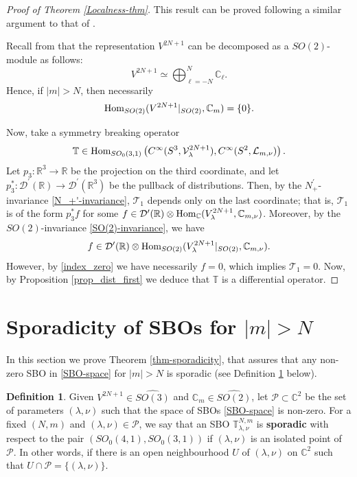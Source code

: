 \documentclass[12pt, pdflatex, a4paper]{article}
\theoremstyle{plain}
\theoremstyle{definition}
\newtheorem{defn}[thm]{Definition}
\def\C{{\mathbb C}}
\def\Dist{\mathcal{D}^\prime}
\def\Hom{\text{\normalfont{Hom}}}
\def\L{\mathcal{L}}
\def\P{\mathcal{P}}
\def\R{{\mathbb R}}
\def\T{{\mathbb T}}
\def\V{\mathcal{V}}
\begin{document}
\begin{proof}[Proof of Theorem \ref{Localness-thm}]
This result can be proved following a similar argument to that of \cite[Thm. 3.6]{KS18}.

Recall from \cite[Lem. 4.1]{Per-Val24} that the representation $V^{2N+1}$ can be decomposed as a $SO(2)$-module as follows:
\begin{equation*}
V^{2N+1} \simeq \bigoplus_{\ell = -N}^N \C_\ell.
\end{equation*}
Hence, if $|m| > N$, then necessarily
\begin{equation}\label{index_zero}
\Hom_{SO(2)}(V^{2N+1}\rvert_{SO(2)}, \C_m) = \{0\}.
\end{equation}

Now, take a symmetry breaking operator 
\begin{equation*}
\mathbb{T} \in \Hom_{SO_0(3,1)}\left(C^\infty(S^3, \V_\lambda^{2N+1}), C^\infty(S^2, \L_{m,\nu})\right).
\end{equation*}
Let $p_3: \R^3 \rightarrow \R$ be the projection on the third coordinate, and let $p_3^*: \Dist(\R) \rightarrow \Dist(\R^3)$ be the pullback of distributions. Then, by the $N_+^\prime$-invariance
\eqref{N_+'-invariance}, $\mathcal{T}_1$ depends only on the last coordinate; that is, $\mathcal{T}_1$ is of the form $p_3^*f$ for some $f \in \Dist(\R) \otimes \Hom_\C(V_\lambda^{2N+1}, \C_{m, \nu})$. Moreover, by the $SO(2)$-invariance \eqref{SO(2)-invariance}, we have
\begin{equation*}
f \in \Dist(\R) \otimes \Hom_{SO(2)}(V_\lambda^{2N+1}\rvert_{SO(2)}, \C_{m, \nu}).
\end{equation*}
However, by \eqref{index_zero} we have necessarily $f = 0$, which implies $\mathcal{T}_1 = 0$. Now, by Proposition \ref{prop_dist_first} we deduce that $\mathbb{T}$ is a differential operator.
\end{proof}

\section{Sporadicity of SBOs for $|m| > N$}\label{section-sporadicity}
In this section we prove Theorem \ref{thm-sporadicity}, that assures that any non-zero SBO in \eqref{SBO-space} for $|m| > N$ is sporadic (see Definition \ref{def-sporadic} below).


\begin{defn}\label{def-sporadic} Given $V^{2N+1} \in \widehat{SO(3)}$ and $\C_m \in \widehat{SO(2)}$, let $\P \subset \C^2$ be the set of parameters $(\lambda, \nu)$ such that the space of SBOs \eqref{SBO-space} is non-zero. For a fixed $(N, m)$ and $(\lambda, \nu) \in \P$, we say that an SBO $\T_{\lambda, \nu}^{N, m}$ is \textbf{sporadic} with respect to the pair $(SO_0(4,1), SO_0(3,1))$ if $(\lambda, \nu)$ is an isolated point of $\P$. In other words, if there is an open neighbourhood $U$ of $(\lambda, \nu)$ on $\C^2$ such that $U\cap\P = \{(\lambda, \nu)\}$.
\end{defn}
\end{document}
